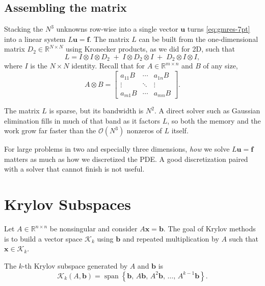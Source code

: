 \subsection{Assembling the matrix}

Stacking the $N^3$ unknowns row-wise into a single vector $\mathbf{u}$ turns
\eqref{eq:gmres-7pt} into a linear system $L\mathbf{u} = \mathbf{f}$. The
matrix $L$ can be built from the one-dimensional matrix
$D_2 \in \mathbb{R}^{N\times N}$ using Kronecker products, as we did for 2D, such that
\begin{equation}
  L = I \otimes I \otimes D_2 \;+\; I \otimes D_2 \otimes I
      \;+\; D_2 \otimes I \otimes I ,
  \label{eq:gmres-kron}
\end{equation}
where $I$ is the $N\times N$ identity. Recall that for
$A\in\mathbb{R}^{m\times n}$ and $B$ of any size,
\[
  A \otimes B =
  \begin{bmatrix}
    a_{11}B & \cdots & a_{1n}B \\
    \vdots  & \ddots & \vdots \\
    a_{m1}B & \cdots & a_{mn}B
  \end{bmatrix}.
\]


The matrix $L$ is sparse, but its bandwidth is $N^2$. A direct solver such as
Gaussian elimination fills in much of that band as it factors $L$, so both
the memory and the work grow far faster than the $\mathcal{O}(N^3)$ nonzeros
of $L$ itself. 

\begin{remark}
For large problems in two and especially three dimensions, \emph{how} we
solve $L\mathbf{u} = \mathbf{f}$ matters as much as how we discretized the
PDE. A good discretization paired with a solver that cannot finish is not
useful.
\end{remark}

\section{Krylov Subspaces}
\label{sec:krylov}

Let $A\in\mathbb{R}^{n\times n}$ be nonsingular and consider $A\mathbf{x} =
\mathbf{b}$. The goal of Krylov methods is to build a vector space $\mathcal{K}_k$ using $\mathbf{b}$ and repeated
multiplication by $A$ such that $\mathbf{x} \in \mathcal{K}_k$.

\begin{definition}
The $k$-th Krylov subspace generated by $A$ and $\mathbf{b}$ is
\[
  \mathcal{K}_k(A,\mathbf{b}) =
  \operatorname{span}\left\{\mathbf{b},\, A\mathbf{b},\, A^2\mathbf{b},\,
  \dots,\, A^{k-1}\mathbf{b}\right\}.
\]
\end{definition}

